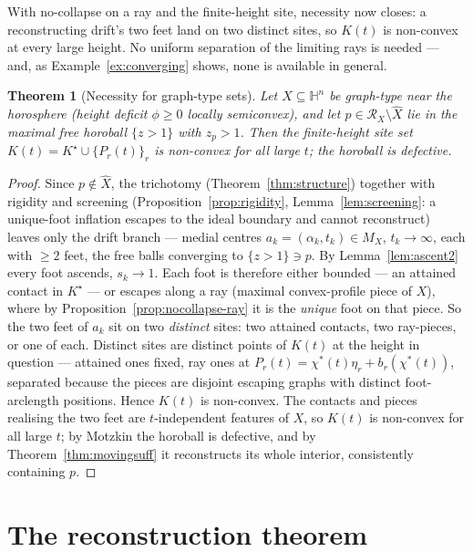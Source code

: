 \documentclass[11pt]{article}
\newtheorem{theorem}{Theorem}[section]
\theoremstyle{remark}
\newcommand{\X}{X}
\newcommand{\Xhat}{\widehat{\X}}
\newcommand{\Mx}{M_{\X}}
\newcommand{\Rx}{\mathcal{R}_{\X}}
\begin{document}
With no-collapse on a ray and the
finite-height site, necessity now closes: a reconstructing drift's two
feet land on two distinct sites, so $K(t)$ is non-convex at every large
height. No uniform separation of the limiting rays is needed --- and, as
Example~\ref{ex:converging} shows, none is available in general.

\begin{theorem}[Necessity for graph-type sets]\label{thm:rays-nec}
Let $\X\subseteq\mathbb{H}^{n}$ be graph-type near the horosphere (height
deficit $\phi\ge0$ locally semiconvex), and let $p\in\Rx\setminus\Xhat$
lie in the maximal free horoball $\{z>1\}$ with $z_{p}>1$. Then the
finite-height site set $K(t)=K^{\star}\cup\{P_{r}(t)\}_{r}$ is non-convex
for all large $t$; the horoball is defective.
\end{theorem}

\begin{proof}
Since $p\notin\Xhat$, the trichotomy (Theorem~\ref{thm:structure})
together with rigidity and screening (Proposition~\ref{prop:rigidity},
Lemma~\ref{lem:screening}: a unique-foot inflation escapes to the ideal
boundary and cannot reconstruct) leaves only the drift branch --- medial
centres $a_{k}=(\alpha_{k},t_{k})\in\Mx$, $t_{k}\to\infty$, each with
$\ge2$ feet, the free balls converging to $\{z>1\}\ni p$. By
Lemma~\ref{lem:ascent2} every foot ascends, $s_{k}\to1$. Each foot is
therefore either bounded --- an attained contact in $K^{\star}$ --- or
escapes along a ray (maximal convex-profile piece of $\X$), where by
Proposition~\ref{prop:nocollapse-ray} it is the \emph{unique} foot on
that piece. So the two feet of $a_{k}$ sit on two \emph{distinct} sites:
two attained contacts, two ray-pieces, or one of each. Distinct sites are
distinct points of $K(t)$ at the height in question --- attained ones
fixed, ray ones at $P_{r}(t)=\chi^{\ast}(t)\eta_{r}+b_{r}(\chi^{\ast}(t))$,
separated because the pieces are disjoint escaping graphs with distinct
foot-arclength positions. Hence $K(t)$ is non-convex. The contacts and
pieces realising the two feet are $t$-independent features of $\X$, so
$K(t)$ is non-convex for all large $t$; by Motzkin the horoball is
defective, and by Theorem~\ref{thm:movingsuff} it reconstructs its whole
interior, consistently containing $p$.
\end{proof}

\section{The reconstruction theorem}\label{sec:assembly}
\end{document}
